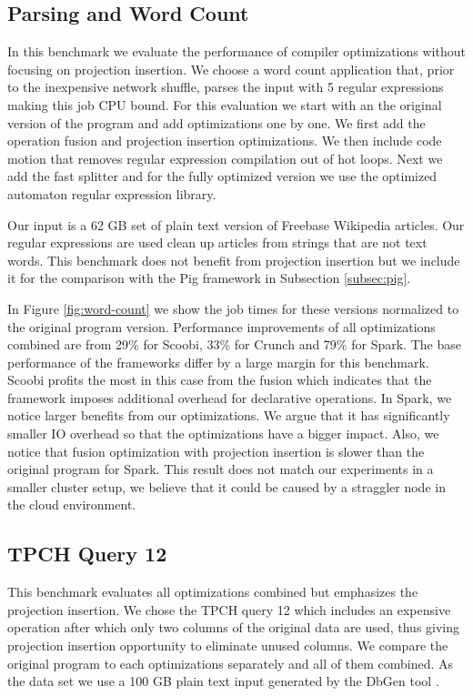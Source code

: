 \subsection{Parsing and Word Count}
\label{subsec:parsing-word-count}

In this benchmark we evaluate the performance of \tool compiler optimizations without focusing on projection insertion. We choose a word count application that, prior to the inexpensive network shuffle, parses the input with 5 regular expressions making this job CPU bound. For this evaluation we start with an the original version of the program and add optimizations one by one. We first add the operation fusion and projection insertion optimizations. We then include code motion that removes regular expression compilation out of hot loops. Next we add the fast splitter and for the fully optimized version we use the optimized automaton regular expression library.    

Our input is a 62 GB set of plain text version of Freebase Wikipedia articles. Our regular expressions are used clean up articles from strings that are not text words. This benchmark does not benefit from projection insertion but we include it for the comparison with the Pig framework in Subsection \ref{subsec:pig}.

In Figure \ref{fig:word-count} we show the job times for these versions normalized to the original program version. Performance improvements of all optimizations combined are from 29\% for Scoobi, 33\% for Crunch and 79\% for Spark. The base performance of the frameworks differ by a large margin for this benchmark. Scoobi profits the most in this case from the fusion which indicates that the framework imposes additional overhead for declarative operations. In Spark, we notice larger benefits from our optimizations. We argue that it has significantly smaller IO overhead so that the optimizations have a bigger impact. Also, we notice that fusion optimization with projection insertion is slower than the original program for Spark. This result does not match our experiments in a smaller cluster setup, we believe that it could be caused by a straggler node in the cloud environment.

\subsection{TPCH Query 12}
\label{subsec:tpch-query-12}

This benchmark evaluates all optimizations combined but emphasizes the projection insertion. We chose the TPCH query 12 which includes an expensive  operation after which only two columns of the original data are used, thus giving projection insertion opportunity to eliminate unused columns. We compare the original program to each optimizations separately and all of them combined. As the data set we use a 100 GB plain text input generated by the DbGen tool \cite{tpch}.

